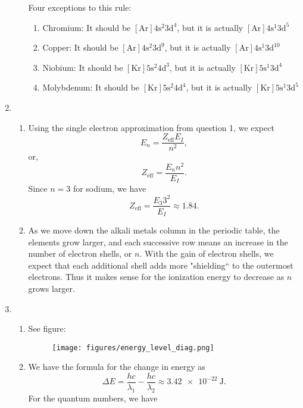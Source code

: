 \documentclass[10pt]{article}
\begin{document}
\begin{enumerate}
\begin{enumerate}
    Four exceptions to this rule:
    \begin{enumerate}
    \item Chromium: It should be $ \left[ \text{Ar} \right] 4 \text{s}^2 3 \text{d}^4 $, but it is actually $ \left[ \text{Ar} \right]  4 \text{s}^1 3 \text{d}^5 $
    \item Copper: It should be $ \left[ \text{Ar} \right]  4 \text{s}^2 3 \text{d}^9 $, but it is actually $ \left[ \text{Ar} \right] 4 \text{s}^1 3 \text{d}^{10} $
    \item Niobium: It should be $ \left[ \text{Kr} \right]  5 \text{s}^2 4 \text{d}^3 $, but it is actually $ \left[ \text{Kr} \right] 5 \text{s}^1 3 \text{d}^{4} $
    \item Molybdenum: It should be $ \left[ \text{Kr} \right]  5 \text{s}^2 4 \text{d}^4 $, but it is actually $ \left[ \text{Kr} \right] 5 \text{s}^1 3 \text{d}^{5} $
    \end{enumerate}
  \end{enumerate}
\item
  \begin{enumerate}
  \item
    Using the single electron approximation from question 1, we expect 
    \[
      E_n = \frac{Z_{\text{eff}}E_I}{n^2}
    ,\]
    or,
    \[
      Z_{\text{eff}} = \frac{E_n n^2}{E_I}
    .\]
    Since $ n=3 $ for sodium, we have
    \[
      Z_{\text{eff}} = \frac{E_3 3^2}{E_I} \approx \num{1.84}
    .\]
  \item
    As we move down the alkali metals column in the periodic table, the elements grow larger, and each successive row means an increase in the number of electron shells, or $ n $.
    With the gain of electron shells, we expect that each additional shell adds more "shielding`` to the outermost electrons.
    Thus it makes sense for the ionization energy to decrease as $ n $ grows larger.
  \end{enumerate}
\item
  \begin{enumerate}
  \item See figure:
    \begin{figure} [H]
      \center
      \texttt{[image: figures/energy\_level\_diag.png]}
    \end{figure}
  \item
    We have the formula for the change in energy as 
    \[
      \Delta E = \frac{hc}{\lambda_1} - \frac{hc}{\lambda_2} \approx \qty{3.42e-22}{\joule}
    .\]
    For the quantum numbers, we have 

\end{enumerate}
\end{enumerate}
\end{document}
